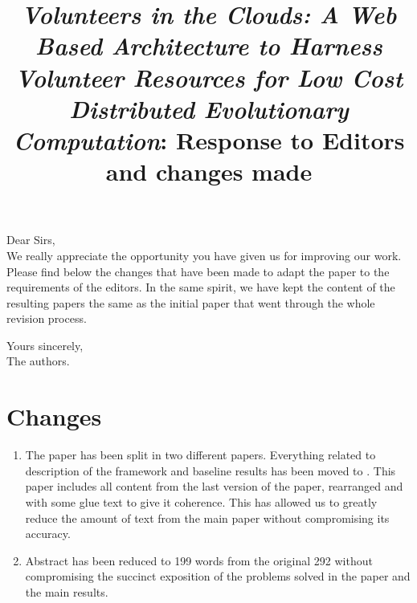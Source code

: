 \documentclass[preprint]{elsarticle}
\begin{document}

\title{{\em Volunteers in the Clouds: A Web Based Architecture to Harness Volunteer Resources 
for Low Cost Distributed Evolutionary Computation}: Response to
Editors and changes made}

\noindent
Dear Sirs,\\

We really appreciate the opportunity you have given us for improving
our work. Please find below the changes that have been made to adapt
the paper to the requirements of the editors. In the same spirit, we
have kept the content of the resulting papers the same as the initial
paper that went through the whole revision process. 

\noindent
Yours sincerely,\\
The authors.

\section{Changes}

\begin{enumerate}
\item The paper has been split in two different papers. Everything
  related to description of the framework and baseline results has
  been moved to \cite{2016arXiv160101607M}. This paper includes all
  content from the last version of the paper, rearranged and with some
  glue text to give it coherence. This has allowed us to greatly
  reduce the amount of text from the main paper without compromising
  its accuracy.
\item Abstract has been reduced to 199 words from the original 292
  without compromising the succinct exposition of the problems solved
  in the paper and the main results.
\end{enumerate}




\end{document}
